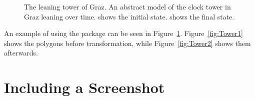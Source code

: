 \begin{figure}[tp]
\centering
{}
\hfill
{}

\caption[Abstract Clock Towers]
{
The leaning tower of Graz. An abstract model of the clock
tower in Graz leaning over time.  shows
the initial state.  shows the final state.
}
\label{fig:WholeFig}
\end{figure}


An example of using the  package can be seen in
Figure~\ref{fig:WholeFig}. Figure~\ref{fig:Tower1} shows the polygons
before transformation, while Figure~\ref{fig:Tower2} shows them
afterwards.





\section{Including a Screenshot}

